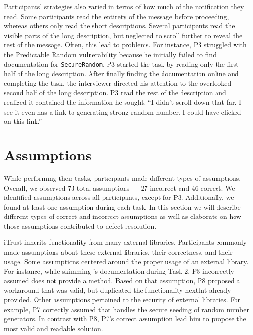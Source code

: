 \documentclass[10pt,journal,compsoc]{IEEEtran}
\begin{document}
Participants' strategies also varied in terms of how much of the notification they read.
Some participants read the entirety of the message before proceeding, whereas others only read the short descriptions. 
Several participants read the visible parts of the long description, but neglected to scroll further to reveal the rest of the message.
Often, this lead to problems. 
For instance, P3 struggled with the Predictable Random vulnerability because he initially failed to find documentation for \texttt{SecureRandom}.
P3 started the task by reading only the first half of the long description.
After finally finding the documentation online and completing the task, the interviewer directed his attention to the overlooked second half of the long description.
P3 read the rest of the description and realized it contained the information he sought,
``I didn't scroll down that far. I see it even has a link to generating strong random number. I could have clicked on this link.'' 


\section{Assumptions}
\label{sec:assumptions}
While performing their tasks, participants made different types of assumptions. 
Overall, we observed 73 total assumptions --- 27 incorrect and 46 correct. 
We identified assumptions across all participants, except for P3.
Additionally, we found at least one assumption during each task.
In this section we will describe different types of correct and incorrect assumptions as well as elaborate on how those assumptions contributed to defect resolution.

iTrust inherits functionality from many external libraries.
Participants commonly made assumptions about these external libraries, their correctness, and their usage.
Some assumptions centered around the proper usage of an external library. 
For instance, while skimming 's documentation during Task 2, P8 incorrectly assumed  does not provide a  method.
Based on that assumption, P8 proposed a workaround that was valid, but duplicated the functionality nextInt already provided.
Other assumptions pertained to the security of external libraries.
For example, P7 correctly assumed that  handles the secure seeding of random number generators.
In contrast with P8, P7's correct assumption lead him to propose the most valid and readable solution.
\end{document}
